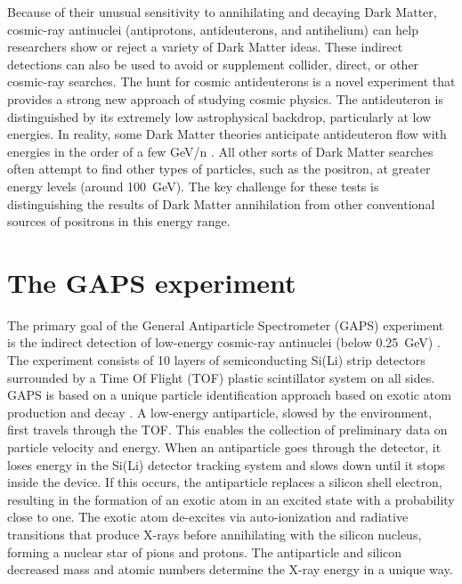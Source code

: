 Because of their unusual sensitivity to annihilating and decaying Dark Matter, cosmic-ray antinuclei (antiprotons, antideuterons, and antihelium) can help researchers show or reject a variety of Dark Matter ideas. These indirect detections can also be used to avoid or supplement collider, direct, or other cosmic-ray searches. The hunt for cosmic antideuterons is a novel experiment that provides a strong new approach of studying cosmic physics. The antideuteron is distinguished by its extremely low astrophysical backdrop, particularly at low energies. In reality, some Dark Matter theories anticipate antideuteron flow with energies in the order of a few GeV/n \cite{doetinchem_2020_cosmicray}. All other sorts of Dark Matter searches often attempt to find other types of particles, such as the positron, at greater energy levels (around \SI{100}{\giga\electronvolt}). The key challenge for these tests is distinguishing the results of Dark Matter annihilation from other conventional sources of positrons in this energy range.


\section{The GAPS experiment}
\label{appendixGAPSexperiment}
The primary goal of the General Antiparticle Spectrometer (GAPS) experiment is the indirect detection of low-energy cosmic-ray antinuclei (below \SI{0.25}{\giga\electronvolt}) \cite{doetinchem_2020_cosmicray}. The experiment consists of 10 layers of semiconducting Si(Li) strip detectors surrounded by a Time Of Flight (TOF) plastic scintillator system on all sides. GAPS is based on a unique particle identification approach based on exotic atom production and decay \cite{re_2022_a}\cite{re_2022_b}. A low-energy antiparticle, slowed by the environment, first travels through the TOF. This enables the collection of preliminary data on particle velocity and energy. When an antiparticle goes through the detector, it loses energy in the Si(Li) detector tracking system and slows down until it stops inside the device. If this occurs, the antiparticle replaces a silicon shell electron, resulting in the formation of an exotic atom in an excited state with a probability close to one. The exotic atom de-excites via auto-ionization and radiative transitions that produce X-rays before annihilating with the silicon nucleus, forming a nuclear star of pions and protons. The antiparticle and silicon decreased mass and atomic numbers determine the X-ray energy in a unique way.

